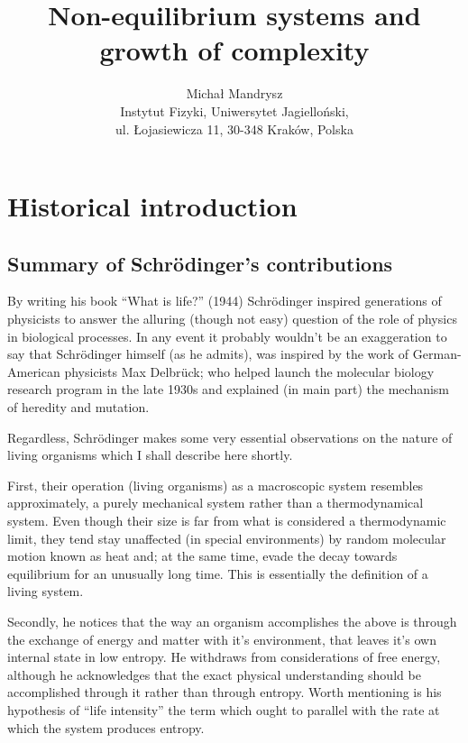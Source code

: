 \documentclass[a4paper,12pt,nofootinbib]{article}
\begin{document}
\title{Non-equilibrium systems and growth of complexity}

\author{Michał Mandrysz \\
Instytut Fizyki, Uniwersytet Jagielloński, \\ul. Łojasiewicza
11, 30-348 Kraków, Polska }

\maketitle

\section{Historical introduction}

\subsection{Summary of Schr{\" o}dinger{'}s contributions}

By writing his book {``}What is life?{''} (1944) Schr{\" o}dinger inspired generations of physicists to answer the alluring (though not easy) question
of the role of physics in biological processes. In any event it probably wouldn't be an exaggeration to say that Schr{\" o}dinger himself (as he
admits), was inspired by the work of German-American physicists Max Delbr{\" u}ck; who helped launch the molecular biology research program in the
late 1930s and explained (in main part) the mechanism of heredity and mutation.

Regardless, Schr{\" o}dinger makes some very essential observations on the nature of living organisms which I shall describe here shortly.

First, their operation (living organisms) as a macroscopic system resembles approximately, a purely mechanical system rather than a thermodynamical
system. Even though their size is far from what is considered a thermodynamic limit, they tend stay unaffected (in special environments) by random
molecular motion known as heat and; at the same time, evade the decay towards equilibrium for an unusually long time. This is essentially the definition
of a living system.

Secondly, he notices that the way an organism accomplishes the above is through the exchange of energy and matter with it's environment, that leaves
it's own internal state in low entropy. He withdraws from considerations of free energy, although he acknowledges that the exact physical understanding
should be accomplished through it rather than through entropy. Worth mentioning is his hypothesis of {``}life intensity{''} the term which ought
to parallel with the rate at which the system produces entropy.
\end{document}
